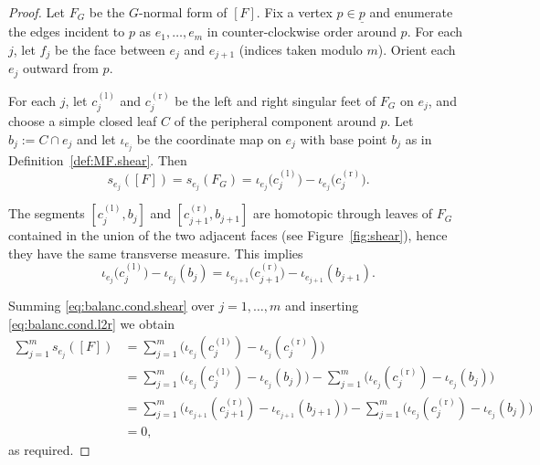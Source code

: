 \documentclass[11pt, letterpaper]{amsart}
\theoremstyle{definition}
\theoremstyle{remark}
\newcommand{\up}{\underline{p}}
\numberwithin{equation}{section}
\begin{document}
\begin{proof}
Let \(F_G\) be the \(G\)-normal form of \([F]\).
Fix a vertex \(p\in\up\) and enumerate the edges incident to \(p\) as \(e_1,\dots,e_m\) in counter-clockwise order around \(p\).
For each \(j\), let \(f_j\) be the face between \(e_j\) and \(e_{j+1}\) (indices taken modulo \(m\)).
Orient each \(e_j\) outward from \(p\).

For each \(j\), let \(c_j^{(\mathrm{l})}\) and \(c_j^{(\mathrm{r})}\) be the left and right singular feet of \(F_G\) on \(e_j\), and choose a simple closed leaf \(C\) of the peripheral component around \(p\).
Let \(b_j:=C\cap e_j\) and let \(\iota_{e_j}\) be the coordinate map on \(e_j\) with base point \(b_j\) as in Definition~\ref{def:MF.shear}.
Then
\begin{equation}
    \label{eq:balanc.cond.shear}
    s_{e_j}([F]) = s_{e_j}(F_G) = \iota_{e_j}\bigl(c_j^{(\mathrm{l})}\bigr) - \iota_{e_j}\bigl(c_j^{(\mathrm{r})}\bigr).
\end{equation}

The segments \([c_j^{(\mathrm{l})},b_j]\) and \([c_{j+1}^{(\mathrm{r})},b_{j+1}]\) are homotopic through leaves of \(F_G\) contained in the union of the two adjacent faces (see Figure~\ref{fig:shear}), hence they have the same transverse measure.
This implies
\begin{equation}
    \label{eq:balanc.cond.l2r}
    \iota_{e_{j}} \bigl(c_j^{(\mathrm{l})}\bigr) - \iota_{e_{j}} (b_j)
    = \iota_{e_{j+1}}\bigl(c^{(\mathrm{r})}_{j+1}\bigr) - \iota_{e_{j+1}} (b_{j+1}).
\end{equation}

Summing \eqref{eq:balanc.cond.shear} over \(j=1,\dots,m\) and inserting \eqref{eq:balanc.cond.l2r} we obtain
\begin{align*}
    \sum_{j=1}^{m} s_{e_j}([F])
    &= \sum_{j=1}^{m} \bigl(\iota_{e_j}(c_j^{(\mathrm{l})}) - \iota_{e_j}(c_j^{(\mathrm{r})})\bigr) \\
    &= \sum_{j=1}^{m} \bigl(\iota_{e_j}(c_j^{(\mathrm{l})}) - \iota_{e_j}(b_j)\bigr)
       - \sum_{j=1}^{m} \bigl(\iota_{e_j}(c_j^{(\mathrm{r})}) - \iota_{e_j}(b_j)\bigr) \\
    &= \sum_{j=1}^{m} \bigl(\iota_{e_{j+1}}(c_{j+1}^{(\mathrm{r})}) - \iota_{e_{j+1}}(b_{j+1})\bigr)
       - \sum_{j=1}^{m} \bigl(\iota_{e_j}(c_j^{(\mathrm{r})}) - \iota_{e_j}(b_j)\bigr) \\
    &= 0,
\end{align*}
as required.
\end{proof}
\end{document}
